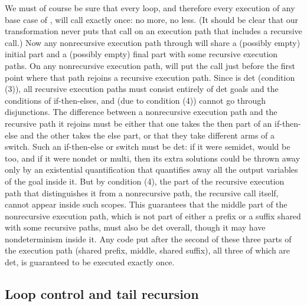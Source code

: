 We must of course be sure that every loop,
and therefore every execution of any base case of ,
will call  exactly once: no more, no less.
(It should be clear that our transformation never puts that call
on an execution path that includes a recursive call.)
Now any nonrecursive execution path through 
will share a (possibly empty) initial part
and a (possibly empty) final part with some recursive execution paths.
On any nonrecursive execution path,
\putbarriers will put the call 
just before the first point where that path
rejoins a recursive execution path.
Since  is det (condition (3)),
all recursive execution paths must consist
entirely of det goals and the conditions of if-then-elses,
and (due to condition (4)) cannot go through disjunctions.
The difference between a nonrecursive execution path
and the recursive path it rejoins
must be either that
one takes the then part of an if-then-else and the other takes the else part,
or that they take different arms of a switch.
Such an if-then-else or switch must be det:
if it were semidet,  would be too,
and if it were nondet or multi,
then its extra solutions could be thrown away
only by an existential quantification that quantifies away
all the output variables of the goal inside it.
But by condition (4),
the part of the recursive execution path
that distinguishes it from a nonrecursive path,
the recursive call itself,
cannot appear inside such scopes.
This guarantees that the middle part of the nonrecursive execution path,
which is not part of either
a prefix or a suffix shared with some recursive paths,
must also be det overall,
though it may have nondeterminism inside it.
Any code put after the second of these three parts of the execution path
(shared prefix, middle, shared suffix),
all three of which are det,
is guaranteed to be executed exactly once.


\subsection{Loop control and tail recursion}
\label{sec:tailrec}

